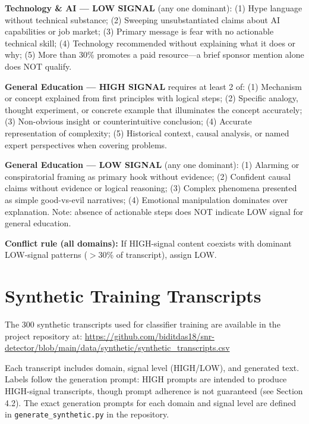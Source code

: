 \documentclass[11pt,a4paper]{article}
\begin{document}
\textbf{Technology \& AI --- LOW SIGNAL} (any one dominant): (1) Hype language without
technical substance; (2) Sweeping unsubstantiated claims about AI capabilities or job market;
(3) Primary message is fear with no actionable technical skill; (4) Technology recommended
without explaining what it does or why; (5) More than 30\% promotes a paid resource---a brief
sponsor mention alone does NOT qualify.

\textbf{General Education --- HIGH SIGNAL} requires at least 2 of: (1) Mechanism or concept
explained from first principles with logical steps; (2) Specific analogy, thought experiment,
or concrete example that illuminates the concept accurately; (3) Non-obvious insight or
counterintuitive conclusion; (4) Accurate representation of complexity; (5) Historical context,
causal analysis, or named expert perspectives when covering problems.

\textbf{General Education --- LOW SIGNAL} (any one dominant): (1) Alarming or conspiratorial
framing as primary hook without evidence; (2) Confident causal claims without evidence or
logical reasoning; (3) Complex phenomena presented as simple good-vs-evil narratives; (4)
Emotional manipulation dominates over explanation. Note: absence of actionable steps does NOT
indicate LOW signal for general education.

\textbf{Conflict rule (all domains):} If HIGH-signal content coexists with dominant LOW-signal
patterns ($>$30\% of transcript), assign LOW.

\section{Synthetic Training Transcripts}
\label{app:synthetic}

The 300 synthetic transcripts used for classifier training are available in the project
repository at: \url{https://github.com/biditdas18/snr-detector/blob/main/data/synthetic/synthetic_transcripts.csv}

Each transcript includes domain, signal level (HIGH/LOW), and generated text. Labels follow
the generation prompt: HIGH prompts are intended to produce HIGH-signal transcripts, though
prompt adherence is not guaranteed (see Section 4.2). The exact generation prompts for each
domain and signal level are defined in \texttt{generate\_synthetic.py} in the repository.
\end{document}
